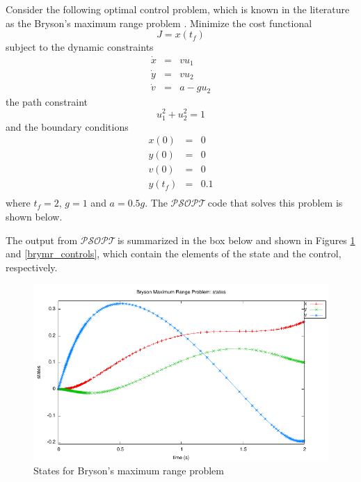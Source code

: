 \documentclass[a4paper,11pt]{report}    %
\newcommand{\psopt}{$\mathcal{PSOPT}$\,}  %
\newenvironment{shadedframe}{%
  \def\FrameCommand{\fcolorbox{black}{shadecolor}}%
  \MakeFramed {\FrameRestore}}
{\endMakeFramed}
\begin{document}
Consider the following optimal control problem, which is known in the literature
as the Bryson's maximum range problem \cite{Bryson:69}.  Minimize the cost functional
\begin{equation}
  J = x(t_f)
\end{equation}
subject to the dynamic constraints
\begin{equation}
  \begin{array}{lcl}
    \dot x & = & v u_1 \\
    \dot y & = & v u_2 \\
    \dot v & = & a - g u_2
  \end{array}
\end{equation}
the path constraint
\begin{equation}
    u_1^2 + u_2^2 = 1
\end{equation}
and the boundary conditions
\begin{equation}
  \begin{array}{lcl}
    x(0) & = & 0 \\
    y(0) & = & 0 \\
    v(0) & = & 0 \\
    y(t_f) & = & 0.1 \\
  \end{array}
\end{equation}
where $t_f=2$, $g=1$ and $a=0.5g$. The
\psopt code that solves this problem is shown below.  

\tiny
\begin{shadedframe}

\end{shadedframe}
\normalsize


The output from \psopt is summarized in the box below and shown in Figures \ref{brymr_states} and \ref{brymr_controls}, which contain the elements
of the state and the control, respectively.


\begin{shadedframe}

\end{shadedframe}

\begin{figure}
  \centering
  \includegraphics{../examples/brymr/brymr_states}
  \caption{States for Bryson's maximum range problem}
  \label{brymr_states}
\end{figure}
\end{document}
